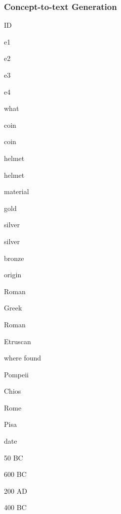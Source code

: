 \documentclass[compress,color=usenames]{beamer}
\begin{document}
\begin{frame}
\frametitle{
Concept-to-text Generation}



ID



e1



e2



e3



e4






what



coin



coin



helmet



helmet


material



gold



silver



silver



bronze






origin



Roman



Greek



Roman



Etruscan










where found



Pompeii



Chios



Rome



Pisa






date



50 BC



600 BC



200 AD



400 BC










\end{frame}
\end{document}
